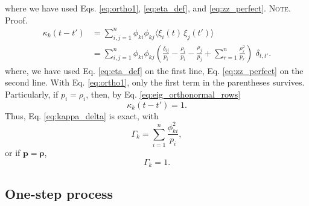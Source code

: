 \documentclass[reprint, floatfix]{revtex4-1}
\newcommand{\note}[1]{{\color{DarkGreen}\footnotesize \textsc{Note.} #1}}
\begin{document}
%
where we have used
Eqs. \eqref{eq:ortho1},
\eqref{eq:eta_def},
and
\eqref{eq:zz_perfect}.
%
\note{Proof.%
  $$
  \begin{aligned}
  \kappa_k(t - t')
  &=
  \sum_{i,j = 1}^n
  \phi_{ki}
  \phi_{kj}
  \langle \xi_i(t) \, \xi_j(t') \rangle
  \\
  &=
  \sum_{i,j = 1}^n
  \phi_{ki}
  \phi_{kj}
  \left(
    \frac{ \delta_{ij} } { p_i }
    -
    \frac{ \rho_i } { p_i }
    -
    \frac{ \rho_j } { p_j }
    +
    \sum_{r = 1}^n
    \frac{ \rho_r^2 } { p_r }
  \right) \,
  \, \delta_{t, t'}
  .
  \end{aligned}
  $$
  where,
  we have used
  Eq. \eqref{eq:eta_def}
  on the first line,
  Eq. \eqref{eq:zz_perfect}
  on the second line.
  With Eq. \eqref{eq:ortho1},
  only the first term in the parentheses survives.
}
Particularly, if $p_i = \rho_i$, then, by
Eq. \eqref{eq:eig_orthonormal_rows}
$$
\kappa_k(t - t') = 1.
$$
Thus, Eq. \eqref{eq:kappa_delta} is exact,
with
$$
\Gamma_k
=
\sum_{ i = 1}^n \frac{ \phi_{ki}^2 } { p_i },
$$
or if $\mathbf p = \pmb \rho$,
\begin{equation}
  \Gamma_k = 1
  .
\label{eq:Gamma_perfect}
\end{equation}




\subsection{\label{sec:Gamma_onestep}
One-step process}
\end{document}

